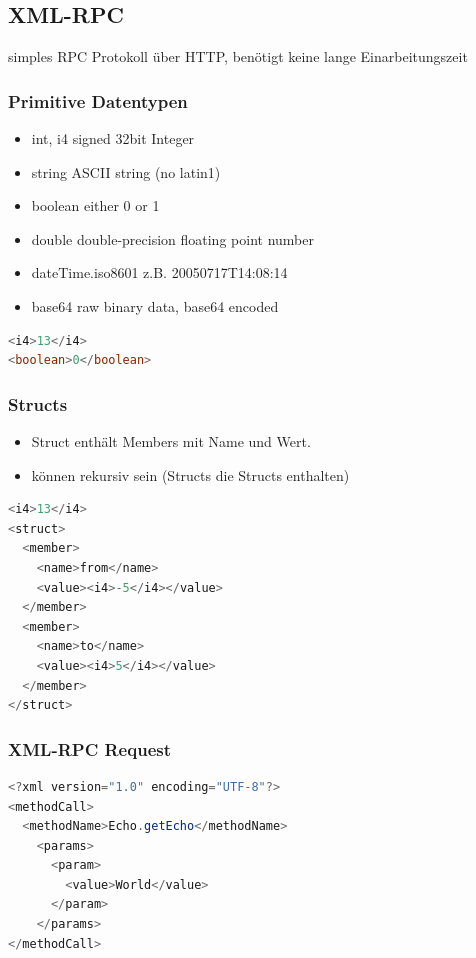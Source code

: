 \documentclass[10pt]{article}
\begin{document}
\subsection{XML-RPC}

simples RPC Protokoll über HTTP, benötigt keine lange Einarbeitungszeit
\subsubsection{Primitive Datentypen}
\begin{itemize}
\item int, i4 \tab signed 32bit Integer
\item string \tab ASCII string (no latin1)
\item boolean \tab either 0 or 1
\item double \tab double-precision floating point number
\item dateTime.iso8601 \tab z.B. 20050717T14:08:14
\item base64 \tab raw binary data, base64 encoded
\end{itemize}

\begin{lstlisting}[language=Java, caption=Beispiele, style=JavaStyle]
<i4>13</i4>
<boolean>0</boolean>
\end{lstlisting}

\subsubsection{Structs}
\begin{itemize}
\item Struct enthält Members mit Name und Wert.
\item können rekursiv sein (Structs die Structs enthalten)
\end{itemize}

\begin{lstlisting}[language=Java, caption=Struct Beispiel, style=JavaStyle]
<i4>13</i4>
<struct> 
  <member> 
    <name>from</name> 
    <value><i4>-5</i4></value> 
  </member> 
  <member> 
    <name>to</name> 
    <value><i4>5</i4></value> 
  </member>
</struct>
\end{lstlisting}



\subsubsection{XML-RPC Request}
\begin{lstlisting}[language=Java, caption=Method Call, style=JavaStyle]
<?xml version="1.0" encoding="UTF-8"?>
<methodCall>
  <methodName>Echo.getEcho</methodName>
    <params>
      <param>
        <value>World</value>
      </param>
    </params>
</methodCall>
\end{lstlisting}
\end{document}
